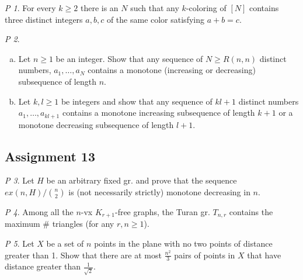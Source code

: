 \documentclass[11pt, fleqn, a4paper, landscape]{article}
\theoremstyle{plain} %
\theoremstyle{remark} %
\newtheorem{problem}{P}
\theoremstyle{definition} %
\begin{document}
\begin{multicols}{5}
\begin{problem}
For every $k\ge 2$ there is an $N$ such that any $k$-coloring of $[N]$ contains three distinct integers $a, b, c$ of the same color satisfying $a + b = c.$
\end{problem}

\begin{problem}
\begin{enumerate}[(a)]
\item Let $n\ge 1$ be an integer. Show that any sequence of $N\ge R(n, n)$  distinct numbers, $a_1,\dots, a_N$ contains a monotone (increasing or decreasing) subsequence of length $n$.
\item Let $k, l \ge1$ be integers and show that any sequence of $kl+1$ distinct numbers $a_1,\dots, a_{kl+1}$ contains a monotone increasing subsequence of length $k + 1$ or a monotone decreasing
subsequence of length $l + 1$.
\end{enumerate}
\end{problem}

\subsection{Assignment 13}

\begin{problem}
Let $H$ be an arbitrary fixed gr. and prove that the sequence $ex(n,H)/\binom{n}{2}$ is (not necessarily strictly) monotone decreasing in $n$.
\end{problem}

\begin{problem}
Among all the $n$-vx $K_{r+1}$-free graphs, the Turan gr. $T_{n,r}$ contains the maximum \# triangles (for any $r, n \ge 1$).
\end{problem}

\begin{problem}
Let $X$ be a set of $n$ points in the plane with no two points of distance greater than 1. Show that there are at most $\frac{n^2}{3}$ pairs of points in $X$ that have distance greater than $\frac{1}{\sqrt{2}}$.
\end{problem}


\end{multicols}
\end{document}
